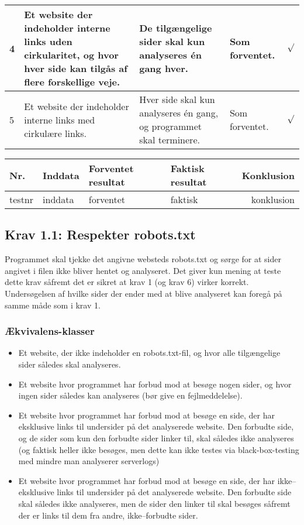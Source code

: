 \documentclass[a4paper,oneside,article]{memoir}
\begin{document}
\begin{landscape}
\begin{longtable}[c]{p{20pt}|p{220pt}|p{130pt}|p{130pt}|r}
4 &
Et website der indeholder interne links uden cirkularitet, og hvor
hver side kan tilgås af flere forskellige veje. &
De tilgængelige sider skal kun analyseres én gang hver. &
Som forventet. &
$\surd$ \\ \hline

5 &
Et website der indeholder interne links med cirkulære links. &
Hver side skal kun analyseres én gang, og programmet skal
terminere. &
Som forventet. &
$\surd$

\end{longtable}

\begin{longtable}[c]{p{20pt}|p{220pt}|p{130pt}|p{130pt}|r}
\textbf{Nr.} &
\textbf{Inddata} &
\textbf{Forventet resultat} &
\textbf{Faktisk resultat} &
\textbf{Konklusion} \\ \hline

testnr &
inddata &
forventet &
faktisk &
konklusion \\ \hline
\end{longtable}

\end{landscape}

\subsection{Krav 1.1: Respekter robots.txt}

Programmet skal tjekke det angivne websteds robots.txt og sørge for at
sider angivet i filen ikke bliver hentet og analyseret. Det giver kun
mening at teste dette krav såfremt det er sikret at krav 1 (og krav 6)
virker korrekt. Undersøgelsen af hvilke sider der ender med at blive
analyseret kan foregå på samme måde som i krav 1.

\subsubsection{Ækvivalens-klasser}
\begin{itemize}
\item Et website, der ikke indeholder en robots.txt-fil, og hvor alle
  tilgængelige sider således skal analyseres.
\item Et website hvor programmet har forbud mod at besøge nogen sider,
  og hvor ingen sider således kan analyseres (bør give en
  fejlmeddelelse).
\item Et website hvor programmet har forbud mod at besøge en side, der
  har eksklusive links til undersider på det analyserede website. Den
  forbudte side, og de sider som kun den forbudte sider linker til,
  skal således ikke analyseres (og faktisk heller ikke besøges, men
  dette kan ikke testes via black-box-testing med mindre man
  analyserer serverlogs)
\item Et website hvor programmet har forbud mod at besøge en side, der
  har ikke--eksklusive links til undersider på det analyserede
  website. Den forbudte side skal således ikke analyseres, men de
  sider den linker til skal besøges såfremt der er links til dem fra
  andre, ikke--forbudte sider.
\end{itemize}
\end{document}
